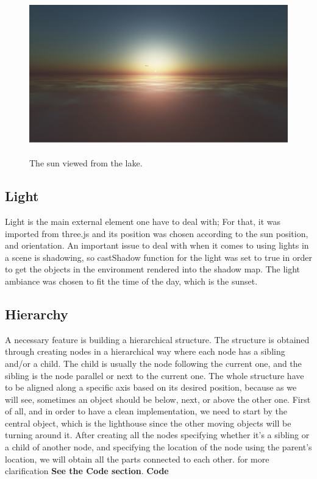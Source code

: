 \documentclass[paper=a4, fontsize=11pt]{scrartcl} %
\numberwithin{equation}{section} %
\numberwithin{figure}{section} %
\numberwithin{table}{section} %
\begin{document}
\begin{figure}[!ht]
\centering
\includegraphics[width=15cm, height=7cm]{images/sun.png}
\caption{The sun viewed from the lake.}
\label{sun}
\end{figure}


\subsection{Light}

Light is the main external element one have to deal with; For that, it was imported from three.js and its position was chosen according to the sun position, and orientation. An important issue to deal with when it comes to using lights in a scene is shadowing, so castShadow function for the light was set to true in order to get the objects in the environment rendered into the shadow map. The light ambiance was chosen to fit the time of the day, which is the sunset.


\subsection{Hierarchy}

A necessary feature is building a hierarchical structure. The structure is obtained through creating nodes in a hierarchical way where each node has a sibling and/or a child. The child is usually the node following the current one, and the sibling is the node parallel or next to the current one. The whole structure have to be aligned along a specific axis based on its desired position, because as we will see, sometimes an object should be below, next, or above the other one. First of all, and in order to have a clean implementation, we need to start by the central object, which is the lighthouse since the other moving objects will be turning around it. After creating all the nodes specifying whether it's a sibling or a child of another node, and specifying the location of the node using the parent's location, we will obtain all the parts connected to each other. for more clarification \textbf{See the Code section}.
\newpage
\textbf{Code}
\end{document}
